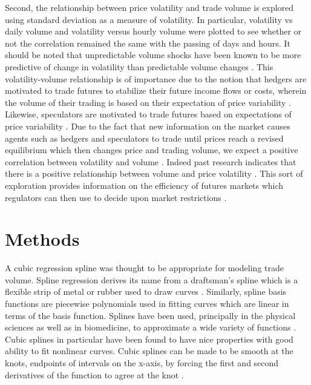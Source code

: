 \documentclass[12pt]{article}
\begin{document}
Second, the relationship between price volatility and trade volume is explored using standard deviation as a measure of volatility. In particular, volatility vs daily volume and volatility versus hourly volume were plotted to see whether or not the correlation remained the same with the passing of days and hours. It should be noted that unpredictable volume shocks have been known to be more predictive of change in volatility than predictable volume changes \cite{bessembinder1993price}.
This volatility-volume relationship is of importance due to the notion that hedgers are motivated to trade futures to stabilize their future income flows or costs, wherein the volume of their trading is based on their expectation of price variability \cite{foster1995volume}. Likewise, speculators are motivated to trade futures based on expectations of price variability \cite{foster1995volume}. Due to the fact that new information on the market causes agents such as hedgers and speculators to trade until prices reach a revised equilibrium which then changes price and trading volume, we expect a positive correlation between volatility and volume \cite{foster1995volume}. Indeed past research indicates that there is a positive relationship between volume and price volatility \cite{foster1995volume}. This sort of exploration provides information on the efficiency of futures markets which regulators can then use to decide upon market restrictions \cite{foster1995volume}. 

\section*{Methods}
A cubic regression spline was thought to be appropriate for modeling trade volume. Spline regression derives its name from a draftsman’s spline which is a flexible strip of metal or rubber used to draw curves \cite{harrell2015regression}. Similarly, spline basis functions are piecewise polynomials used in fitting curves which are linear in terms of the basis function. Splines have been used, principally in the physical sciences as well as in biomedicine, to approximate a wide variety of functions \cite{harrell2015regression}. Cubic splines in particular have been found to have nice properties with good ability to fit nonlinear curves. Cubic splines can be made to be smooth at the knots, endpoints of intervals on the x-axis, by forcing the first and second derivatives of the function to agree at the knot \cite{harrell2015regression}.  
\end{document}
